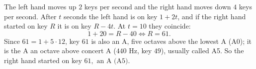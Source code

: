 The left hand moves up $2$ keys per second and the right hand moves down $4$ keys per second. After $t$ seconds the left hand is on key $1+2t$, and if the right hand started on key $R$ it is on key $R-4t$. At $t=10$ they coincide:
\[1+20=R-40\iff R=61.\]
Since $61=1+5\cdot12$, key $61$ is also an A, five octaves above the lowest A (A0); it is the A an octave above concert A ($440$ Hz, key $49$), usually called A5. So the right hand started on $\boxed{\text{key }61,\text{ an A (A5)}}$.
